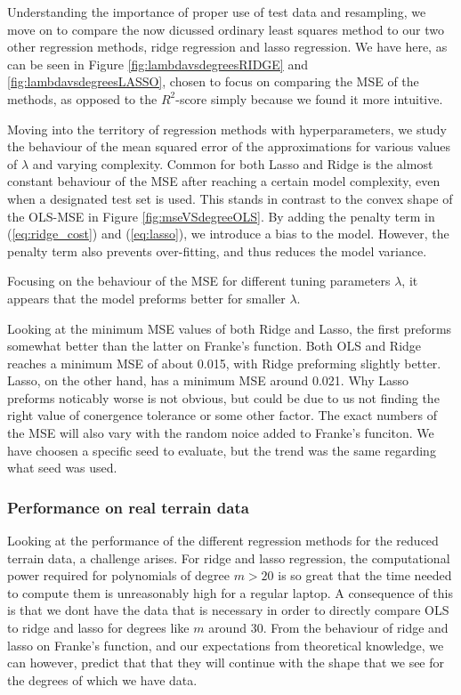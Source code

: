 Understanding the importance of proper use of test data and resampling, we move on to compare the now dicussed ordinary least squares method to our two other regression methods, ridge regression and lasso regression. We have here, as can be seen in Figure \ref{fig:lambdavsdegreesRIDGE} and \ref{fig:lambdavsdegreesLASSO}, chosen to focus on comparing the MSE of the methods, as opposed to the $R^2$-score simply because we found it more intuitive.

Moving into the territory of regression methods with hyperparameters, we study the behaviour of the mean squared error of the approximations for various values of $\lambda$ and varying complexity.
Common for both Lasso and Ridge is the almost constant behaviour of the MSE after reaching a certain model complexity, even when a designated test set is used. This stands in contrast to the convex shape of the OLS-MSE in Figure \ref{fig:mseVSdegreeOLS}. By adding the penalty term in (\ref{eq:ridge_cost}) and (\ref{eq:lasso}), we introduce a bias to the model. However, the penalty term also prevents over-fitting, and thus reduces the model variance.

Focusing on the behaviour of the MSE for different tuning parameters $\lambda$, it appears that the model preforms better for smaller $\lambda$.

Looking at the minimum MSE values of both Ridge and Lasso, the first preforms somewhat better than the latter on Franke's function. Both OLS and Ridge reaches a minimum MSE of about 0.015, with Ridge preforming slightly better. Lasso, on the other hand, has a minimum MSE around 0.021. Why Lasso preforms noticably worse is not obvious, but could be due to us not finding the right value of conergence tolerance or some other factor. The exact numbers of the MSE will also vary with the random noice added to Franke's funciton. We have choosen a specific seed to evaluate, but the trend was the same regarding what seed was used.


\subsubsection*{Performance on real terrain data}
Looking at the performance of the different regression methods for the reduced terrain data, a challenge arises. For ridge and lasso regression, the computational power required for polynomials of degree $m > 20$ is so great that the time needed to compute them is unreasonably high for a regular laptop. A consequence of this is that we dont have the data that is necessary in order to directly compare OLS to ridge and lasso for degrees like $m$ around 30. From the behaviour of ridge and lasso on Franke's function, and our expectations from theoretical knowledge, we can however, predict that that they will continue with the shape that we see for the degrees of which we have data.

